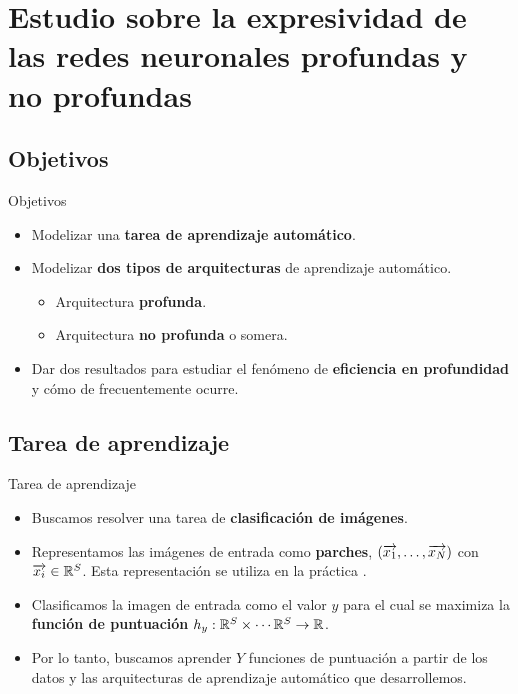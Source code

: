 \section{Estudio sobre la expresividad de las redes neuronales profundas y no profundas}

\subsection{Objetivos}
\begin{frame}{Objetivos}
	\begin{itemize}
		\item Modelizar una \textbf{tarea de aprendizaje automático}.
		\item Modelizar \textbf{dos tipos de arquitecturas} de aprendizaje automático.
		      \begin{itemize}
			      \item Arquitectura \textbf{profunda}.
			      \item Arquitectura \textbf{no profunda} o somera.
		      \end{itemize}
		\item Dar dos resultados para estudiar el fenómeno de \textbf{eficiencia en profundidad} y cómo de frecuentemente ocurre.
	\end{itemize}
\end{frame}

\subsection{Tarea de aprendizaje}
\begin{frame}{Tarea de aprendizaje}

	\begin{itemize}
		\item Buscamos resolver una tarea de \textbf{clasificación de imágenes}.
		\item Representamos las imágenes de entrada como \textbf{parches}, $(\overrightarrow{x_1}, \ldots, \overrightarrow{x_N})$ con $\overrightarrow{x_i} \in \mathbb{R}^S$. Esta representación se utiliza en la práctica \cite{matematicas:vit}.
		\item Clasificamos la imagen de entrada como el valor $y$ para el cual se maximiza la \textbf{función de puntuación} $h_y: \mathbb{R}^S \times \cdots \mathbb{R}^S \to \mathbb{R}$.
		\item Por lo tanto, buscamos aprender $Y$ funciones de puntuación a partir de los datos y las arquitecturas de aprendizaje automático que desarrollemos.
	\end{itemize}

\end{frame}

